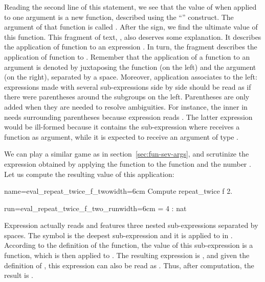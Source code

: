 Reading the second line of this statement, we see that the value
of  when applied to one argument is a new
function, described using the ``'' construct.  The
argument of that function is called .  After the \C{=>} sign, we
find the ultimate value of this function.  This fragment of text, , also deserves some explanation. It describes the
application of function  to an expression .  In turn,
the fragment  describes the application of function  to
. Remember that the  application of a function to an
argument is denoted by juxtaposing the function (on the left) and
the argument (on the right), separated by a space. Moreover,
application associates to the left: expressions made with
several sub-expressions side by side should be read as if there were
parentheses around the subgroups on the left. Parentheses are
only added when they are needed to resolve ambiguities.
For instance, the inner  in
 needs surrounding parentheses because expression
 reads .  The latter expression would be
ill-formed because it contains the sub-expression  where
 receives a function as argument, while it is expected to receive
an argument of type .

We can play a similar game as in section~\ref{sec:fun-sev-args},
and scrutinize the expression obtained by applying the
function  to  the function
 and the number . Let us compute the resulting value of this
application:

\begin{coq-left}{name=eval_repeat_twice_f_two}{width=6cm}
Compute repeat_twice f 2.
\end{coq-left}
\begin{coqout-right}{run=eval_repeat_twice_f_two_run}{width=6cm}
= 4 : nat
\end{coqout-right}

Expression  actually reads
 and features three nested sub-expressions separated by
spaces. The symbol  is the deepest
sub-expression and it is applied to  in .
According to the definition of the  function, the value of
this sub-expression is a function, which is then applied to .
The resulting expression is , and given the
definition of , this expression can also
be read as .  Thus, after computation, the result is .

